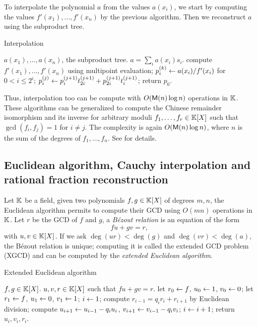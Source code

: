 To interpolate the polynomial $a$ from the values $a(x_i)$, we start
by computing the values $f'(x_1),\ldots,f'(x_n)$ by the previous
algorithm. Then we reconstruct $a$ using the subproduct tree.

\begin{algorithm}
  \caption{\label{alg:interp}Interpolation}
  \begin{algorithmic}[1]
    \REQUIRE $a(x_1),\ldots,a(x_n)$, the subproduct tree.
    \ENSURE $a=\sum_i a(x_i)s_i$.
    \STATE compute $f'(x_1),\ldots,f'(x_n)$ using multipoint evaluation;
    \STATE $p_i^{(k)}\leftarrow a(x_i)/f'(x_i)$ for $0<i\le2^i$;
    \STATE $p_i^{(j)} \leftarrow p_i^{(j+1)}t_{2i}^{(j+1)} + p_{2i}^{(j+1)}t_{i}^{(j+1)}$;
    \ENDFOR
    \ENDFOR
    \STATE return $p_0$.
  \end{algorithmic}
\end{algorithm}

Thus, interpolation too can be compute with $O(\mathsf{M}(n)\log n)$
operations in $\mathbb{K}$. These algorithms can be generalized to compute the
Chinese remainder isomorphism and its inverse for arbitrary moduli
$f_1,\ldots,f_r\in\mathbb{K}[X]$ such that $\gcd(f_i,f_j)=1$ for $i\ne j$. The
complexity is again $O(\mathsf{M}(n)\log n)$, where $n$ is the sum of the
degrees of $f_1,\ldots,f_n$. See \cite[$\S10$]{vzGG} for details.



\subsection[XGCD, Cauchy interpolation and RFR]{Euclidean algorithm,
  Cauchy interpolation and rational fraction reconstruction}
\label{sec:eucl-algor-rati}
Let $\mathbb{K}$ be a field, given two polynomials $f,g\in\mathbb{K}[X]$ of degrees
$m,n$, the Euclidean algorithm permits to
compute their GCD using $O(mn)$ operations in $\mathbb{K}$. Let $r$
be the GCD of $f$ and $g$, a \textit{Bézout
  relation} is an equation of the form
\begin{equation}
  \label{eq:154}
  fu + gv = r
  \text{,}
\end{equation}
with $u,v\in\mathbb{K}[X]$. If we ask $\deg(ur)<\deg(g)$ and
$\deg(vr)<\deg(a)$, the Bézout relation is unique; computing it is
called the extended GCD problem (XGCD) and can be computed
by the \textit{extended Euclidean
  algorithm}.

\begin{algorithm}
  \caption{Extended Euclidean algorithm}
  \begin{algorithmic}[1]
    \REQUIRE $f,g\in\mathbb{K}[X]$.
    \ENSURE $u,v,r\in\mathbb{K}[X]$ such that $fu+gv=r$.
    \STATE let $r_0\leftarrow f$, $u_0\leftarrow1$, $v_0\leftarrow0$;
    \STATE let $r_1\leftarrow f$, $u_1\leftarrow0$, $v_1\leftarrow1$;
    \STATE $i\leftarrow1$;
    \STATE compute $r_{i-1} = q_ir_i + r_{i+1}$ by Euclidean division;
    \STATE compute $u_{i+1} \leftarrow u_{i-1} - q_iu_i$, $v_{i+1} \leftarrow v_{i-1} - q_iv_i$;
    \STATE $i\leftarrow i+1$;
    \ENDWHILE
    \STATE return $u_i,v_i,r_i$.
  \end{algorithmic}
\end{algorithm}

